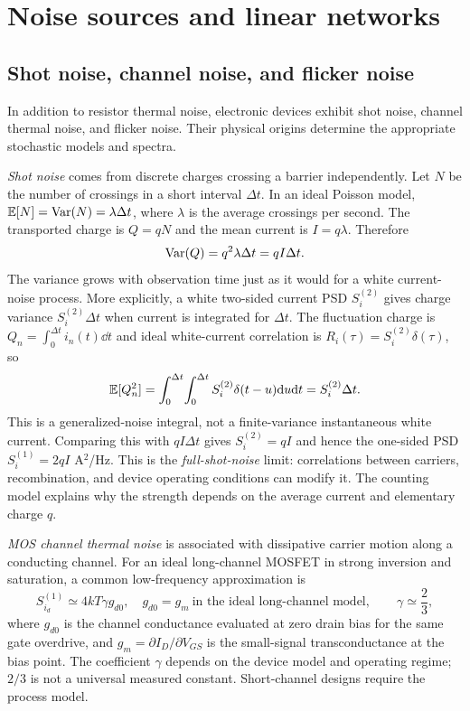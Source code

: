 \section{Noise sources and linear networks}
\subsection{Shot noise, channel noise, and flicker noise}
In addition to resistor thermal noise, electronic devices exhibit shot noise, channel thermal noise, and flicker noise. Their physical origins determine the appropriate stochastic models and spectra.

\emph{Shot noise} comes from discrete charges crossing a barrier independently. Let $N$ be the number of crossings in a short interval $\Delta t$. In an ideal Poisson model, $\mathbb E[N]=\operatorname{Var}(N)=\lambda\Delta t$, where $\lambda$ is the average crossings per second. The transported charge is $Q=qN$ and the mean current is $I=q\lambda$. Therefore
\[
\operatorname{Var}(Q)=q^2\lambda\Delta t=qI\Delta t.
\]
The variance grows with observation time just as it would for a white current-noise process. More explicitly, a white two-sided current PSD $S_i^{(2)}$ gives charge variance $S_i^{(2)}\Delta t$ when current is integrated for $\Delta t$. The fluctuation charge is $Q_n=\int_0^{\Delta t}i_n(t)\dd t$ and ideal white-current correlation is $R_i(\tau)=S_i^{(2)}\delta(\tau)$, so
\[
\mathbb E[Q_n^2]=\int_0^{\Delta t}\!\int_0^{\Delta t}
S_i^{(2)}\delta(t-u)\mathrm d u\mathrm d t=S_i^{(2)}\Delta t.
\]
This is a generalized-noise integral, not a finite-variance instantaneous white current.
Comparing this with $qI\Delta t$ gives $S_i^{(2)}=qI$ and hence the one-sided PSD $S_i^{(1)}=2qI$ A$^2$/Hz. This is the \emph{full-shot-noise} limit: correlations between carriers, recombination, and device operating conditions can modify it. The counting model explains why the strength depends on the average current and elementary charge $q$.

\emph{MOS channel thermal noise} is associated with dissipative carrier motion along a conducting channel. For an ideal long-channel MOSFET in strong inversion and saturation, a common low-frequency approximation is
\begin{equation}
S_{i_d}^{(1)}\simeq4kT\gamma g_{d0},\quad g_{d0}=g_m\ \text{in the ideal long-channel model},
\qquad \gamma\simeq\frac23,\label{eq:mos}
\end{equation}
where $g_{d0}$ is the channel conductance evaluated at zero drain bias for the same gate overdrive, and $g_m=\partial I_D/\partial V_{GS}$ is the small-signal transconductance at the bias point. The coefficient $\gamma$ depends on the device model and operating regime; $2/3$ is not a universal measured constant. Short-channel designs require the process model.

